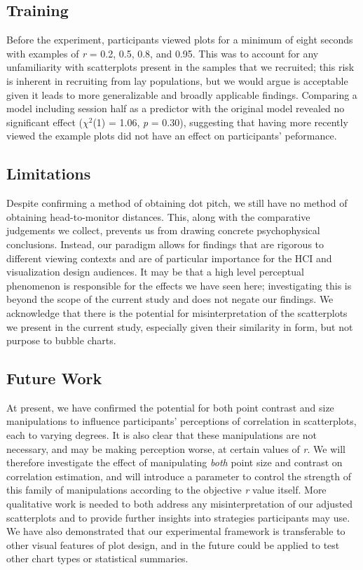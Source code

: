 \documentclass{vgtc}                          %
\begin{document}
\hypertarget{training}{%
\subsection{Training}\label{training}}

Before the experiment, participants viewed plots for a minimum of
eight seconds with examples of \emph{r} = 0.2, 0.5, 0.8, and 0.95. This was to account
for any unfamiliarity with scatterplots present in the samples
that we recruited; this risk is inherent in recruiting from lay populations, but we
would argue is acceptable given it leads to more generalizable and broadly
applicable findings. Comparing a model including session half as a predictor with the
original model revealed no significant effect (\(\chi^2\)(1)
= 1.06, \emph{p} = 0.30),
suggesting that having more recently viewed the example plots did not have an effect
on participants' peformance.

\hypertarget{limitations}{%
\subsection{Limitations}\label{limitations}}

Despite confirming a method of obtaining dot pitch, we still have no method of obtaining
head-to-monitor distances. This, along with the comparative judgements we collect, prevents us
from drawing concrete psychophysical conclusions. Instead, our paradigm allows
for findings that are rigorous to different viewing contexts and
are of particular importance for the HCI and visualization design audiences. It
may be that a high level perceptual phenomenon is responsible for the effects
we have seen here; investigating this is beyond the scope of the current study and
does not negate our findings. We acknowledge that there is the potential for misinterpretation
of the scatterplots we present in the current study, especially given their similarity in
form, but not purpose to bubble charts.

\hypertarget{future-work}{%
\subsection{Future Work}\label{future-work}}

At present, we have confirmed the potential for both point contrast and size
manipulations to influence participants' perceptions of correlation in scatterplots,
each to varying degrees. It is also clear that these manipulations are not necessary,
and may be making perception worse, at certain values of \emph{r}. We will therefore
investigate the effect of manipulating \emph{both} point size and contrast on correlation
estimation, and will introduce a parameter to control the strength of this
family of manipulations according to the objective \emph{r} value itself.
More qualitative work is needed to both address any misinterpretation
of our adjusted scatterplots and to provide further insights into strategies
participants may use. We have also demonstrated that our
experimental framework \cite{strain_2023} is transferable to other visual features
of plot design, and in the future could be applied to test other chart types or
statistical summaries.
\end{document}
